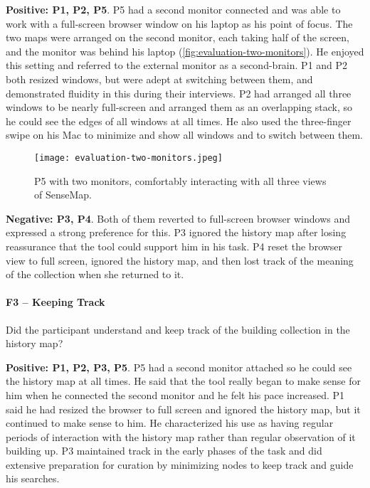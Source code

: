 \textbf{Positive: P1, P2, P5}. P5 had a second monitor connected and was able to work with a full-screen browser window on his laptop as his point of focus. The two maps were arranged on the second monitor, each taking half of the screen, and the monitor was behind his laptop (\autoref{fig:evaluation-two-monitors}). He enjoyed this setting and referred to the external monitor as a second-brain. P1 and P2 both resized windows, but were adept at switching between them, and demonstrated fluidity in this during their interviews. P2 had arranged all three windows to be nearly full-screen and arranged them as an overlapping stack, so he could see the edges of all windows at all times. He also used the three-finger swipe on his Mac to minimize and show all windows and to switch between them.

\begin{figure}[!htb]
	\centering
	\texttt{[image: evaluation-two-monitors.jpeg]}
	\caption{P5 with two monitors, comfortably interacting with all three views of SenseMap.}
	\label{fig:evaluation-two-monitors}
\end{figure}

\textbf{Negative: P3, P4}. Both of them reverted to full-screen browser windows and expressed a strong preference for this. P3 ignored the history map after losing reassurance that the tool could support him in his task. P4 reset the browser view to full screen, ignored the history map, and then lost track of the meaning of the collection when she returned to it.

\paragraph{F3 -- Keeping Track}
Did the participant understand and keep track of the building collection in the history map?

\textbf{Positive: P1, P2, P3, P5}. P5 had a second monitor attached so he could see the history map at all times. He said that the tool really began to make sense for him when he connected the second monitor and he felt his pace increased. P1 said he had resized the browser to full screen and ignored the history map, but it continued to make sense to him. He characterized his use as having regular periods of interaction with the history map rather than regular observation of it building up. P3 maintained track in the early phases of the task and did extensive preparation for curation by minimizing nodes to keep track and guide his searches.

